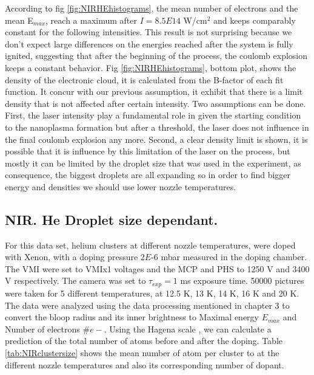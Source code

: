 According to fig \ref{fig:NIRHEhistograms}, the mean number of electrons and the mean E$_{max}$, reach a maximum after $I=8.5E14$ W/cm$^{2}$ and keeps comparably constant for the following intensities. This result is not surprising because we don't expect large differences on the energies reached after the system is fully ignited, suggesting that after the beginning of the process, the coulomb explosion keeps a constant behavior. Fig \ref{fig:NIRHEhistograms}, bottom plot, shows the density of the electronic cloud, it is calculated from the B-factor of each fit function. It concur with our previous  assumption, it exhibit that there is a limit density that is not affected after certain intensity. Two assumptions can be done. First, the laser intensity play a fundamental role in given the starting condition to the nanoplasma formation but after a threshold, the laser does not influence in the final coulomb explosion any more. Second, a clear density limit is shown, it is possible that it is influence by this limitation of the laser on the process, but mostly it can be limited by the droplet size that was used in the experiment, as consequence, the biggest droplets are all expanding so in order to find bigger energy and densities we should use lower nozzle temperatures.  

 



\subsection{NIR. He Droplet size dependant.}

 For this data set, helium clusters at different nozzle temperatures, were doped with Xenon, with a doping pressure 2$E$-6 mbar measured in the doping chamber. The VMI were set to VMIx1 voltages and the MCP and PHS to 1250 V and 3400 V respectively. The camera was set to $\tau_{exp}=1$ ms exposure time. 50000 pictures were taken for 5 different temperatures, at 12.5 K, 13 K, 14 K, 16 K and 20 K. The data were analyzed using the data processing mentioned in chapter 3 to convert the bloop radius and its inner brightness to Maximal energy $E_{max}$ and Number of electrons $\#e-$.  Using the Hagena scale \cite{hagena_cluster_1972}, we can calculate a prediction of the total number of atoms before and after the doping. Table \ref{tab:NIRclustersize} shows the  mean number of atom per cluster to at the different nozzle temperatures and also its corresponding number of dopant. 

